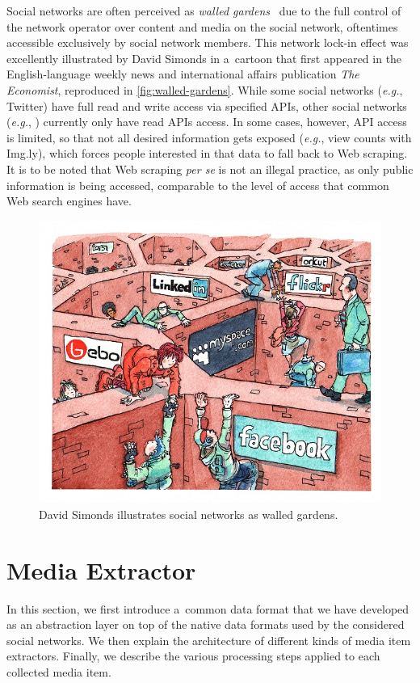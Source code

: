 Social networks are often perceived as
\emph{walled gardens}~\cite{simonds2008walledgarden}
due to the full control of the network operator
over content and media on the social network,
oftentimes accessible exclusively by social network members.
This network lock-in effect was excellently illustrated
by David Simonds in a~cartoon that first appeared
in the English-language weekly news and
international affairs publication \emph{The Economist},
reproduced in \autoref{fig:walled-gardens}.
While some social networks (\emph{e.g.}, Twitter)
have full read and write access via specified APIs,
other social networks (\emph{e.g.}, \googleplus)
currently only have read APIs access.
In some cases, however, API access is limited,
so that not all desired information gets exposed
(\emph{e.g.}, view counts with Img.ly),
which forces people interested in that data
to fall back to Web scraping.
It is to be noted that Web scraping \emph{per se}
is not an illegal practice, as only public information is being accessed,
comparable to the level of access that common Web search engines have.

\begin{figure}[h!]
  \centering
  \includegraphics[width=0.7\linewidth,
    trim=16px 17px 12px 15px,clip]{davidsimonds.jpg}
  \caption[David Simonds illustrates social networks as walled
    gardens.]
    {David Simonds illustrates social networks as walled
    gardens.}
  \label{fig:walled-gardens}
\end{figure}

\section{Media Extractor}
\label{sec:media-extractor}

In this section, we first introduce a~common data format
that we have developed as an abstraction layer on top of the native
data formats used by the considered social networks.
We then explain the architecture
of different kinds of media item extractors.
Finally, we describe the various processing steps
applied to each collected media item.

